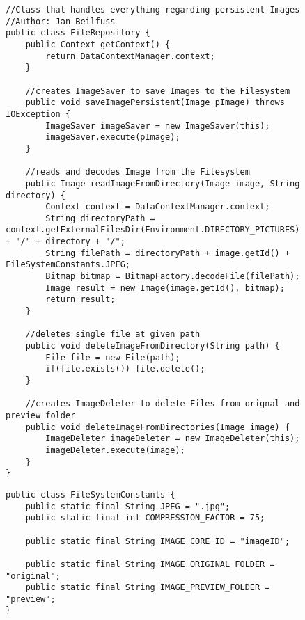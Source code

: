 \begin{figure}[H]
\begin{lstlisting}[caption=FileRepositroy (Jan Beilfuß)]
//Class that handles everything regarding persistent Images
//Author: Jan Beilfuss
public class FileRepository {
    public Context getContext() {
        return DataContextManager.context;
    }

    //creates ImageSaver to save Images to the Filesystem
    public void saveImagePersistent(Image pImage) throws IOException {
        ImageSaver imageSaver = new ImageSaver(this);
        imageSaver.execute(pImage);
    }

    //reads and decodes Image from the Filesystem
    public Image readImageFromDirectory(Image image, String directory) {
        Context context = DataContextManager.context;
        String directoryPath = context.getExternalFilesDir(Environment.DIRECTORY_PICTURES).getAbsolutePath() + "/" + directory + "/";
        String filePath = directoryPath + image.getId() + FileSystemConstants.JPEG;
        Bitmap bitmap = BitmapFactory.decodeFile(filePath);
        Image result = new Image(image.getId(), bitmap);
        return result;
    }

    //deletes single file at given path
    public void deleteImageFromDirectory(String path) {
        File file = new File(path);
        if(file.exists()) file.delete();
    }

    //creates ImageDeleter to delete Files from orignal and preview folder
    public void deleteImageFromDirectories(Image image) {
        ImageDeleter imageDeleter = new ImageDeleter(this);
        imageDeleter.execute(image);
    }
}
\end{lstlisting}
\end{figure}

\begin{figure}[H]
\begin{lstlisting}[caption=FileSystemConstants (Jan Beilfuß)]
public class FileSystemConstants {
    public static final String JPEG = ".jpg";
    public static final int COMPRESSION_FACTOR = 75;

    public static final String IMAGE_CORE_ID = "imageID";

    public static final String IMAGE_ORIGINAL_FOLDER = "original";
    public static final String IMAGE_PREVIEW_FOLDER = "preview";
}
\end{lstlisting}
\end{figure}
